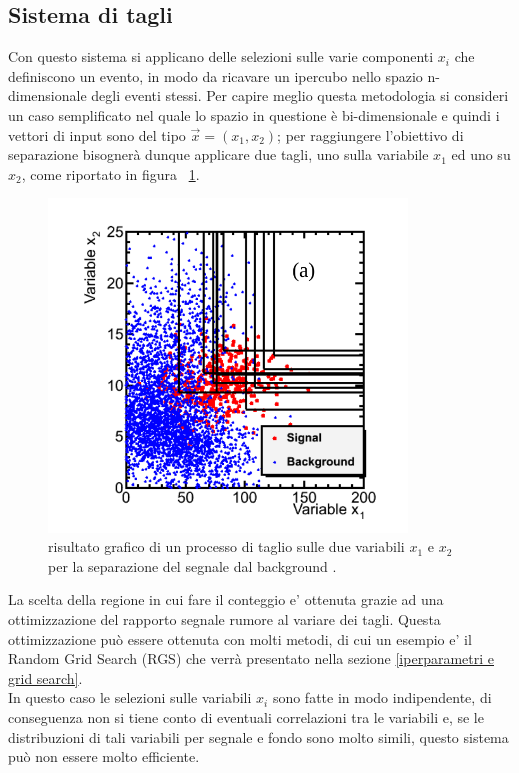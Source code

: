 \subsection{Sistema di tagli}
\label{sistema di tagli}
Con questo sistema si applicano delle selezioni sulle varie componenti $x_i$ che definiscono un evento, in modo da ricavare un ipercubo nello spazio n-dimensionale degli eventi stessi. Per capire meglio questa metodologia si consideri un caso semplificato nel quale lo spazio in questione è bi-dimensionale e quindi i vettori di input sono del tipo $\vec{x} = (x_1,x_2)$; per raggiungere l'obiettivo di separazione bisognerà dunque applicare due tagli, uno sulla variabile $x_1$ ed uno su $x_2$, come riportato in figura ~\ref{fig:grid_example}.

\begin{figure}[h!]
	\centering
	\includegraphics[width=0.85\textwidth]{figs/Grid_example.png}
	\caption{risultato grafico di un processo di taglio sulle due variabili $x_1$ e $x_2$ per la separazione del segnale dal background \cite{Metodi_multivariati}.}
	\label{fig:grid_example}
\end{figure}

La scelta della regione in cui fare il conteggio e' ottenuta grazie ad una ottimizzazione del rapporto segnale rumore al variare dei tagli. Questa ottimizzazione può essere ottenuta con molti metodi, di cui un esempio e' il Random Grid Search (RGS) che verrà presentato nella sezione \ref{iperparametri e grid search}. \\
In questo caso le selezioni sulle variabili $x_i$ sono fatte in modo indipendente, di conseguenza non si tiene conto di eventuali correlazioni tra le variabili e, se le distribuzioni di tali variabili per segnale e fondo sono molto simili, questo sistema può non essere molto efficiente.

